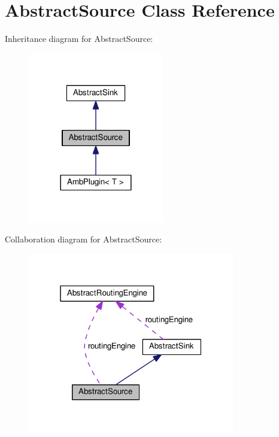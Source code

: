 \hypertarget{classAbstractSource}{\section{Abstract\+Source Class Reference}
\label{classAbstractSource}
}


Inheritance diagram for Abstract\+Source\+:\nopagebreak
\begin{figure}[H]
\begin{center}
\leavevmode
\includegraphics[width=168pt]{classAbstractSource__inherit__graph}
\end{center}
\end{figure}


Collaboration diagram for Abstract\+Source\+:\nopagebreak
\begin{figure}[H]
\begin{center}
\leavevmode
\includegraphics[width=256pt]{classAbstractSource__coll__graph}
\end{center}
\end{figure}
